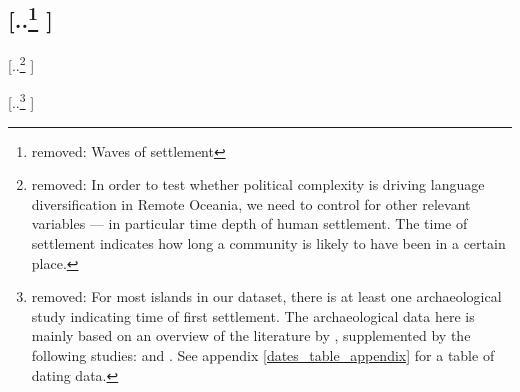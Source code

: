 \documentclass[unnumsec,webpdf,modern,medium]{oup-authoring-template}
\providecommand{\DIFdeltex}[1]{{\protect\color{red} [..\footnote{removed: #1} ]}} %
\providecommand{\DIFdelbegin}{} %
\providecommand{\DIFdelend}{} %
\providecommand{\DIFdel}[1]{\texorpdfstring{\DIFdeltex{#1}}{}} %
\newcommand{\DIFscaledelfig}{0.5}
\newlength{\DIFdelgraphicswidth} %
\newlength{\DIFdelgraphicsheight} %
\newcommand{\DIFdelincludegraphics}[2][]{%
\sbox{\DIFdelgraphicsbox}{\DIFOincludegraphics[#1]{#2}}%
\settoboxwidth{\DIFdelgraphicswidth}{\DIFdelgraphicsbox} %
\settoboxtotalheight{\DIFdelgraphicsheight}{\DIFdelgraphicsbox} %
\scalebox{\DIFscaledelfig}{%
\parbox[b]{\DIFdelgraphicswidth}{\usebox{\DIFdelgraphicsbox}\\[-\baselineskip] \rule{\DIFdelgraphicswidth}{0em}}\llap{\resizebox{\DIFdelgraphicswidth}{\DIFdelgraphicsheight}{%
\setlength{\unitlength}{\DIFdelgraphicswidth}%
\begin{picture}(1,1)%
\thicklines\linethickness{2pt} %
{\color[rgb]{1,0,0}\put(0,0){\framebox(1,1){}}}%
{\color[rgb]{1,0,0}\put(0,0){\line( 1,1){1}}}%
{\color[rgb]{1,0,0}\put(0,1){\line(1,-1){1}}}%
\end{picture}%
}\hspace*{3pt}}} %
} %
\DeclareRobustCommand{\DIFdelbegin}{\DIFOdelbegin \let\includegraphics\DIFdelincludegraphics} %
\DeclareRobustCommand{\DIFdelend}{\DIFOaddend \let\includegraphics\DIFOincludegraphics} %
\begin{document}
\subsection{\DIFdel{Waves of settlement}}
\addtocounter{subsection}{-1}%
\DIFdel{In order to test whether political complexity is driving language diversification in Remote Oceania, we need to control for other relevant variables --- in particular time depth of human settlement. The time of settlement indicates how long a community is likely to have been in a certain place. 
}\DIFdelend %



\DIFdelbegin \DIFdel{For most islands in our dataset, there is at least one archaeological study indicating time of first settlement. The archaeological data here is mainly based on an overview of the literature by \citet{rieth_cochrane_2018}, supplemented by the following studies: \citet{intoh2007reconnaissance, intoh2008ongoing, carson2012recent, kirch2012basline, Napolitano_et_al_yap, ellis2012saipan} and \citet{levin_seikel_miles_2019}. See appendix \ref{dates_table_appendix} for a table of dating data. }\DIFdelend %
\end{document}
